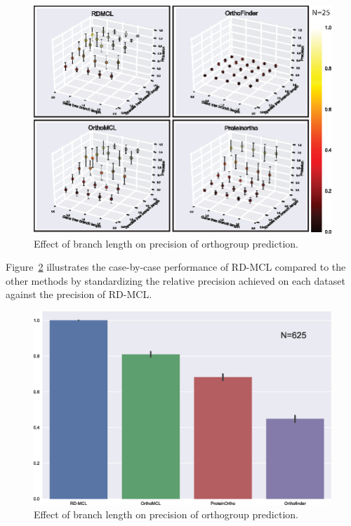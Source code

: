 \documentclass[twocolumn]{bmcart}  %
\begin{document}
\begin{figure}[t]
  \begin{center}
  \includegraphics[height=0.25\textheight]{../figures/branch_len_3D_scatter.eps}
\end{center}
\caption{Effect of branch length on precision of orthogroup prediction.}
\label{fig:branch_len_3d}
\end{figure}


Figure~\ref{fig:branch_len_std} illustrates the case-by-case performance of RD-MCL compared to the other methods by standardizing the relative precision achieved on each dataset against the precision of RD-MCL\@.


\begin{figure}[t]
  \begin{center}
  \includegraphics[height=0.22\textheight]{../figures/branch_len_bargraph.eps}
\end{center}
\caption{Effect of branch length on precision of orthogroup prediction.}
\label{fig:branch_len_std}
\end{figure}
\end{document}
